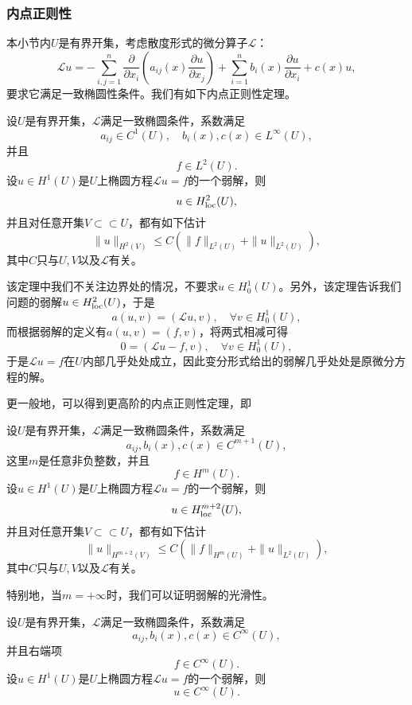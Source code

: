 \documentclass[a4paper,10pt]{ctexart}
\begin{document}
\subsubsection{内点正则性}
本小节内$ U $是有界开集，考虑散度形式的微分算子$ \mathcal{L} $：
\[
    \mathcal{L}u = -\sum_{i,j=1}^n \dfrac{\partial}{\partial x_i} \left( a_{ij}(x) \dfrac{\partial u}{\partial x_j} \right) + \sum_{i=1}^n b_i(x) \dfrac{\partial u}{\partial x_i} + c(x)u,  
\]
要求它满足一致椭圆性条件。我们有如下内点正则性定理。
\begin{theorem}
    设$ U $是有界开集，$ \mathcal{L} $满足一致椭圆条件，系数满足
    \[
        a_{ij}\in C^1(U),\quad b_i(x),c(x)\in L^\infty(U),
    \]
    并且
    \[
        f\in L^2(U).
    \]
    设$ u\in H^1(U) $是$ U $上椭圆方程$ \mathcal{L}u = f $的一个弱解，则
    \begin{equation}
        u \in H_{\rm loc}^2(U),
    \end{equation}
    并且对任意开集$ V\subset\subset U $，都有如下估计
    \begin{equation}
        \| u \|_{H^2(V)} \leqslant C (\| f \|_{L^2(U)} + \| u \|_{L^2(U)}),
    \end{equation}
    其中$ C $只与$ U,V $以及$ \mathcal{L} $有关。
\end{theorem}
\noindent 该定理中我们不关注边界处的情况，不要求$ u\in H^1_0(U) $。另外，该定理告诉我们问题的弱解$ u\in H^2_{\rm loc}(U) $，于是
\[
    a(u,v) = (\mathcal{L}u,v),\quad \forall v\in H^1_0(U),
\]
而根据弱解的定义有$ a(u,v) = (f,v) $，将两式相减可得
\[
    0 = (\mathcal{L}u-f,v),\quad \forall v\in H^1_0(U),
\]
于是$ \mathcal{L}u = f $在$ U $内部几乎处处成立，因此变分形式给出的弱解几乎处处是原微分方程的解。

更一般地，可以得到更高阶的内点正则性定理，即
\begin{theorem}
    设$ U $是有界开集，$ \mathcal{L} $满足一致椭圆条件，系数满足
    \[
        a_{ij},b_i(x),c(x)\in C^{m+1}(U),
    \]
    这里$ m $是任意非负整数，并且
    \[
        f\in H^m(U).
    \]
    设$ u\in H^1(U) $是$ U $上椭圆方程$ \mathcal{L}u = f $的一个弱解，则
    \begin{equation}
        u \in H_{\rm loc}^{m+2}(U),
    \end{equation}
    并且对任意开集$ V\subset\subset U $，都有如下估计
    \begin{equation}
        \| u \|_{H^{m+2}(V)} \leqslant C (\| f \|_{H^m(U)} + \| u \|_{L^2(U)}),
    \end{equation}
    其中$ C $只与$ U,V $以及$ \mathcal{L} $有关。
\end{theorem}
特别地，当$ m=+\infty $时，我们可以证明弱解的光滑性。
\begin{theorem}
    设$ U $是有界开集，$ \mathcal{L} $满足一致椭圆条件，系数满足
    \[
        a_{ij},b_i(x),c(x)\in C^{\infty}(U),
    \]
    并且右端项
    \[
        f\in C^{\infty}(U).
    \]
    设$ u\in H^1(U) $是$ U $上椭圆方程$ \mathcal{L}u = f $的一个弱解，则
    \begin{equation}
        u \in C^{\infty}(U).
    \end{equation}
\end{theorem}
\end{document}
